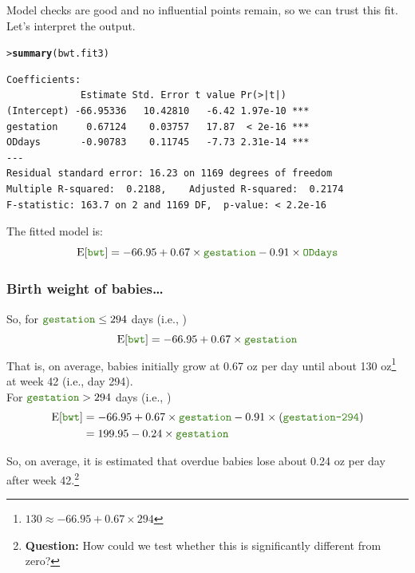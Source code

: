 \documentclass{beamer}\usepackage[]{graphicx}\usepackage[]{xcolor}
\makeatletter
\newcommand{\hlstd}[1]{\textcolor[rgb]{0.345,0.345,0.345}{#1}}%
\newcommand{\hlkwd}[1]{\textcolor[rgb]{0.737,0.353,0.396}{\textbf{#1}}}%
\newenvironment{kframe}{%
 \def\at@end@of@kframe{}%
 \ifinner\ifhmode%
  \def\at@end@of@kframe{\end{minipage}}%
  \begin{minipage}{\columnwidth}%
 \fi\fi%
 \def\FrameCommand##1{\hskip\@totalleftmargin \hskip-\fboxsep
 \colorbox{shadecolor}{##1}\hskip-\fboxsep
     \hskip-\linewidth \hskip-\@totalleftmargin \hskip\columnwidth}%
 \MakeFramed {\advance\hsize-\width
   \@totalleftmargin\z@ \linewidth\hsize
   \@setminipage}}%
 {\par\unskip\endMakeFramed%
 \at@end@of@kframe}
\newenvironment{knitrout}{}{} %
\makeatother
\begin{document}
\begin{frame}[fragile]

Model checks are good and no influential points remain, so we can trust this fit. 
Let's interpret the output.

\begin{knitrout}\scriptsize
{}\color{fgcolor}\begin{kframe}
\begin{alltt}
\hlstd{> }\hlkwd{summary}\hlstd{(bwt.fit3)}
\end{alltt}
\end{kframe}
\end{knitrout}

\begin{knitrout}\scriptsize
{}\color{fgcolor}\begin{kframe}
\begin{verbatim}
Coefficients:
             Estimate Std. Error t value Pr(>|t|)    
(Intercept) -66.95336   10.42810   -6.42 1.97e-10 ***
gestation     0.67124    0.03757   17.87  < 2e-16 ***
ODdays       -0.90783    0.11745   -7.73 2.31e-14 ***
---
Residual standard error: 16.23 on 1169 degrees of freedom
Multiple R-squared:  0.2188,	Adjusted R-squared:  0.2174 
F-statistic: 163.7 on 2 and 1169 DF,  p-value: < 2.2e-16
\end{verbatim}
\end{kframe}
\end{knitrout}

The fitted model is:
\[
 \E[\rcode{bwt}]=-66.95 + 0.67\times\rcode{gestation} -0.91\times\rcode{ODdays}  
\]
\end{frame}



\begin{frame}[fragile]
\frametitle{Birth weight of babies\ldots}
So, for $\rcode{gestation} \le 294$ days (i.e., )
\[
\E[\rcode{bwt}]=-66.95+0.67\times\rcode{gestation}
\]
That is, on average, babies initially grow at 0.67 oz per day until about 130 oz\footnote{
$130 \approx -66.95 + 0.67\times 294$} at week 42 (i.e., day 294).\\
\bigskip
For $\rcode{gestation} > 294$ days (i.e., )
\begin{align*}
\E[\rcode{bwt}]&=-66.95+0.67\times\rcode{gestation}  -0.91\times(\rcode{gestation-294})\\
           &= 199.95 - 0.24\times\rcode{gestation}
\end{align*}

So, on average, it is estimated that overdue babies lose about 0.24 oz per day after week 42.\footnote{{\bf Question:} How could we test whether this is significantly different from zero?}
\end{frame}
\end{document}
